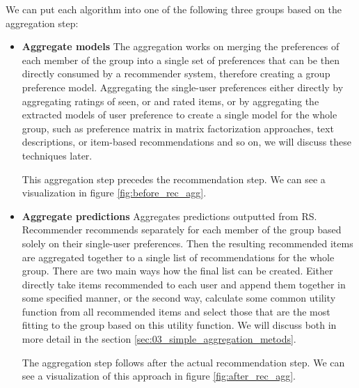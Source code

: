 We can put each algorithm into one of the following three groups based on the aggregation step:
\begin{itemize}
    \item \textbf{Aggregate models} \newline
    The aggregation works on merging the preferences of each member of the group into a single set of preferences that can be then directly consumed by a recommender system, therefore creating a group preference model. Aggregating the single-user preferences either directly by aggregating ratings of seen, or and rated items, or by aggregating the extracted models of user preference to create a single model for the whole group, such as preference matrix in matrix factorization approaches, text descriptions, or item-based recommendations and so on, we will discuss these techniques later.
    
    
    This aggregation step precedes the recommendation step. We can see a visualization in figure \ref{fig:before_rec_agg}.
    
    
    \item \textbf{Aggregate predictions} \newline
     Aggregates predictions outputted from RS. Recommender recommends separately for each member of the group based solely on their single-user preferences. Then the resulting recommended items are aggregated together to a single list of recommendations for the whole group. There are two main ways how the final list can be created. Either directly take items recommended to each user and append them together in some specified manner, or the second way, calculate some common utility function from all recommended items and select those that are the most fitting to the group based on this utility function. We will discuss both in more detail in the section \ref{sec:03_simple_aggregation_metods}.
     
     The aggregation step follows after the actual recommendation step. We can see a visualization of this approach in figure \ref{fig:after_rec_agg}.
     

\end{itemize}
